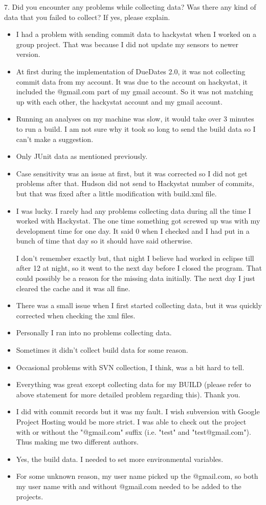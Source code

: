 \documentclass[11pt]{article}
\begin{document}
7. Did you encounter any problems while collecting data? Was 
there any kind of data that you failed to collect? If yes, 
please explain. 
\begin{itemize}
\item I had a problem with sending commit data to hackystat when I worked on a group project. That was because I did not update my sensors to newer version. 
\item At first during the implementation of DueDates 2.0, it was not collecting commit data from my account. It was due to the account on hackystat, it included the @gmail.com part of my gmail account. So it was not matching up with each other, the hackystat account and my gmail account.
\item Running an analyses on my machine was slow, it would take over 3 minutes to run a build.  I am not sure why it took so long to send the build data so I can't make a suggestion.
\item Only JUnit data as mentioned previously.
\item Case sensitivity was an issue at first, but it was corrected so I did not get problems after that.  Hudson did not send to Hackystat number of commits, but that was fixed after a little modification with build.xml file.   
\item I was lucky. I rarely had any problems collecting data during all the time I worked with Hackystat. The one time something got screwed up was with my development time for one day. It said 0 when I checked and I had put in a bunch of time that day so it should have said otherwise. 

I don't remember exactly but, that night I believe had worked in eclipse till after 12 at night, so it went to the next day before I closed the program. That could possibly be a reason for the missing data initially. The next day I just cleared the cache and it was all fine.
\item There was a small issue when I first started collecting data, but it was quickly corrected when checking the xml files.
\item Personally I ran into no problems collecting data.
\item Sometimes it didn't collect build data for some reason.
\item Occasional problems with SVN collection, I think, was a bit hard to tell.
\item Everything was great except collecting data for my BUILD (please refer to above statement for more detailed problem regarding this). Thank you.
\item I did with commit records but it was my fault.  I wish subversion with Google Project Hosting would be more strict.  I was able to check out the project with or without the "@gmail.com" suffix (i.e. "test" and "test@gmail.com").  Thus making me two different authors.
\item Yes, the build data.  I needed to set more environmental variables. 
\item For some unknown reason, my user name picked up the @gmail.com, so both my user name with and without @gmail.com needed to be added to the projects.
\end{itemize}
\end{document}
